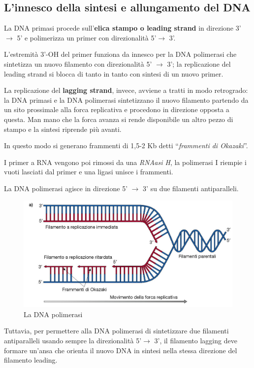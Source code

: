 \documentclass[11pt]{book}
\begin{document}
\subsection{L'innesco della sintesi e allungamento del DNA} 
La DNA primasi procede sull’\textbf{elica stampo o leading strand} in direzione 3’ $\to$ 5’ e polimerizza un primer con direzionalità 5’$\to$ 3’.

L’estremità 3’-OH del primer funziona da innesco per la DNA polimerasi che sintetizza un nuovo filamento con direzionalità 5’ $\to$ 3’; la replicazione del leading strand si blocca di tanto in tanto con sintesi di un nuovo primer.

\vspace{1em}
La replicazione del \textbf{lagging strand}, invece, avviene a tratti in modo retrogrado: la DNA primasi e la DNA polimerasi sintetizzano il nuovo filamento partendo da un sito prossimale alla forca replicativa e procedono in direzione opposta a questa.
Man mano che la forca avanza si rende disponibile un altro pezzo di stampo e la sintesi riprende più avanti.

In questo modo si generano frammenti di 1,5-2 Kb detti ``\emph{frammenti di Okazaki}''.
 
I primer a RNA vengono poi rimossi da una \emph{RNAasi H}, la polimerasi I riempie i vuoti lasciati dal primer e una ligasi unisce i frammenti.

\clearpage
La DNA polimerasi agisce in direzione 5’ $\to$ 3’ su due filamenti antiparalleli.

\begin{figure}[htp]
\centering
\includegraphics[scale=0.2]{img/Leading strand.png}
\caption{La DNA polimerasi}
\label{}
\end{figure}

Tuttavia, per permettere alla DNA polimerasi di sintetizzare due filamenti antiparalleli
usando sempre la direzionalità 5’$\to$ 3’, il filamento lagging deve formare un’ansa che
orienta il nuovo DNA in sintesi nella stessa direzione del filamento leading.
\end{document}
